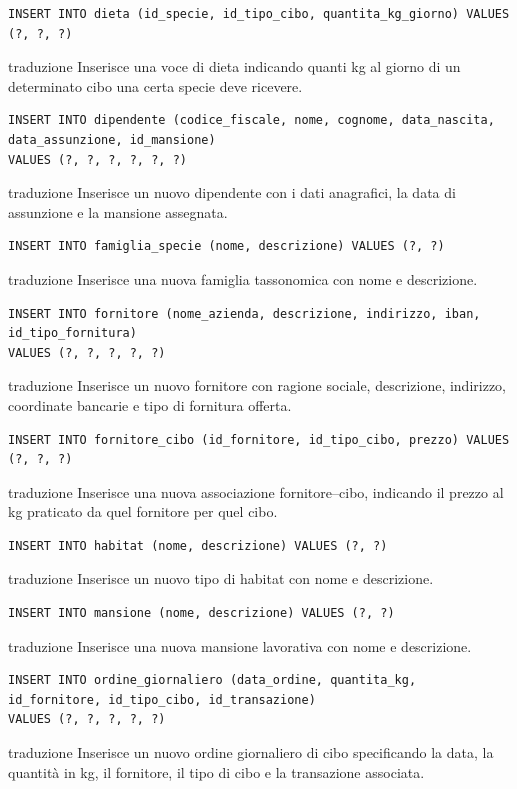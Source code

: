 \documentclass[12pt,a4paper]{report}
\begin{document}
\begin{lstlisting}[style=sqlstyle]
INSERT INTO dieta (id_specie, id_tipo_cibo, quantita_kg_giorno) VALUES (?, ?, ?)
\end{lstlisting}
traduzione {Inserisce una voce di dieta indicando quanti kg al giorno di un determinato cibo una certa specie deve ricevere.}

\begin{lstlisting}[style=sqlstyle]
INSERT INTO dipendente (codice_fiscale, nome, cognome, data_nascita, data_assunzione, id_mansione)
VALUES (?, ?, ?, ?, ?, ?)
\end{lstlisting}
traduzione {Inserisce un nuovo dipendente con i dati anagrafici, la data di assunzione e la mansione assegnata.}

\begin{lstlisting}[style=sqlstyle]
INSERT INTO famiglia_specie (nome, descrizione) VALUES (?, ?)
\end{lstlisting}
traduzione {Inserisce una nuova famiglia tassonomica con nome e descrizione.}

\begin{lstlisting}[style=sqlstyle]
INSERT INTO fornitore (nome_azienda, descrizione, indirizzo, iban, id_tipo_fornitura)
VALUES (?, ?, ?, ?, ?)
\end{lstlisting}
traduzione {Inserisce un nuovo fornitore con ragione sociale, descrizione, indirizzo, coordinate bancarie e tipo di fornitura offerta.}

\begin{lstlisting}[style=sqlstyle]
INSERT INTO fornitore_cibo (id_fornitore, id_tipo_cibo, prezzo) VALUES (?, ?, ?)
\end{lstlisting}
traduzione {Inserisce una nuova associazione fornitore--cibo, indicando il prezzo al kg praticato da quel fornitore per quel cibo.}

\begin{lstlisting}[style=sqlstyle]
INSERT INTO habitat (nome, descrizione) VALUES (?, ?)
\end{lstlisting}
traduzione {Inserisce un nuovo tipo di habitat con nome e descrizione.}

\begin{lstlisting}[style=sqlstyle]
INSERT INTO mansione (nome, descrizione) VALUES (?, ?)
\end{lstlisting}
traduzione {Inserisce una nuova mansione lavorativa con nome e descrizione.}

\begin{lstlisting}[style=sqlstyle]
INSERT INTO ordine_giornaliero (data_ordine, quantita_kg, id_fornitore, id_tipo_cibo, id_transazione)
VALUES (?, ?, ?, ?, ?)
\end{lstlisting}
traduzione {Inserisce un nuovo ordine giornaliero di cibo specificando la data, la quantità in kg, il fornitore, il tipo di cibo e la transazione associata.}
\end{document}
